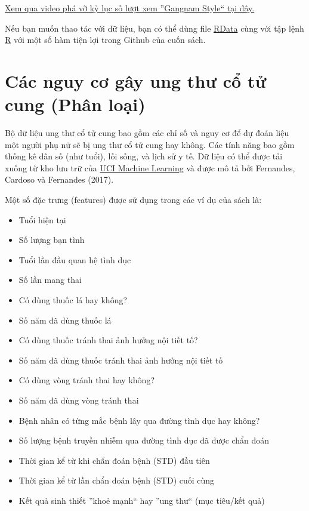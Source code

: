 \href{https://www.youtube.com/watch?v=9bZkp7q19f0&feature=player_embedded}{Xem qua video phá vỡ kỷ lục số lượt xem ''Gangnam Style`` tại đây.}

Nếu bạn muốn thao tác với dữ liệu, bạn có thể dùng file \href{https://github.com/christophM/interpretable-ml-book/blob/master/data/ycomments.RData}{RData} cùng với tập lệnh \href{https://github.com/christophM/interpretable-ml-book/blob/master/R/get-SpamTube-dataset.R}{R} với một số hàm tiện lợi trong Github của cuốn sách.

\section{Các nguy cơ gây ung thư cổ tử cung (Phân loại)} \label{chap_3.3}
Bộ dữ liệu ung thư cổ tử cung bao gồm các chỉ số và nguy cơ để dự đoán liệu một người phụ nữ sẽ bị ung thư cổ tử cung hay không. Các tính năng bao gồm thống kê dân số (như tuổi), lối sống, và lịch sử y tế. Dữ liệu có thể được tải xuống từ kho lưu trữ của \href{https://archive.ics.uci.edu/ml/datasets/Cervical+cancer+\%28Risk+Factors\%29}{UCI Machine Learning} và được mô tả bởi Fernandes, Cardoso và Fernandes (2017).

Một số đặc trưng (features) được sử dụng trong các ví dụ của sách là: 
\begin{itemize} 
    \item Tuổi hiện tại
    \item Số lượng bạn tình
    \item Tuổi lần đầu quan hệ tình dục
    \item Số lần mang thai
    \item Có dùng thuốc lá hay không?
    \item Số năm đã dùng thuốc lá
    \item Có dùng thuốc tránh thai ảnh hưởng nội tiết tố?
    \item Số năm đã dùng thuốc tránh thai ảnh hưởng nội tiết tố
    \item Có dùng vòng tránh thai hay không?
    \item Số năm đã dùng vòng tránh thai
    \item Bệnh nhân có từng mắc bệnh lây qua đường tình dục hay không?
    \item Số lượng bệnh truyền nhiễm qua đường tình dục đã được chẩn đoán
    \item Thời gian kể từ khi chẩn đoán bệnh (STD) đầu tiên
    \item Thời gian kể từ lần chẩn đoán bệnh (STD) cuối cùng
    \item Kết quả sinh thiết ''khoẻ mạnh`` hay ''ung thư`` (mục tiêu/kết quả)
\end{itemize}

